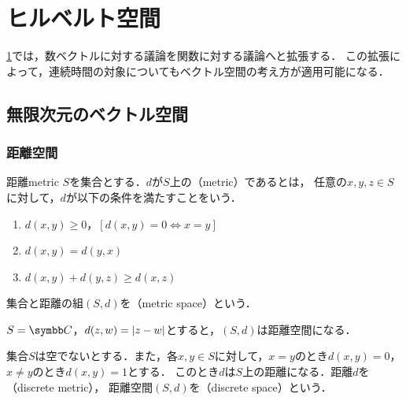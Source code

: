 \documentclass[../../main]{subfiles}
\begin{document}
\chapter{ヒルベルト空間}
\label{chapter:hilbert_space}

\begin{lead}
  \cref{chapter:hilbert_space}では，数ベクトルに対する議論を関数に対する議論へと拡張する．
  この拡張によって，連続時間の対象についてもベクトル空間の考え方が適用可能になる．
\end{lead}

\section{無限次元のベクトル空間}

\subsection{距離空間}

\begin{definition}{距離}{metric}
  \(S\)を集合とする．\(d\)が\(S\)上の（metric）であるとは，
  任意の\(x,y,z\in S\)に対して，\(d\)が以下の条件を満たすことをいう．
  \begin{enumerate}
    \item \(d(x,y)\geq 0\)，\([d(x,y)=0\iff x=y]\)
    \item \(d(x,y)=d(y,x)\)
    \item \(d(x,y)+d(y,z)\geq d(x,z)\)
  \end{enumerate}
\end{definition}

集合と距離の組\((S,d)\)を（metric space）という．

\begin{example}
  \label{example:metric_space}
  \(S=\numset{C}\)，\(d(z,w)=\lvert z-w\rvert\)とすると，\((S,d)\)は距離空間になる．
\end{example}

\begin{example}[離散距離]
  \label{example:discrete_metric}
  集合\(S\)は空でないとする．また，各\(x,y\in S\)に対して，\(x=y\)のとき\(d(x,y)=0\)，\(x\neq y\)のとき\(d(x,y)=1\)とする．
  このとき\(d\)は\(S\)上の距離になる．距離\(d\)を（discrete metric），
  距離空間\((S,d)\)を（discrete space）という．
\end{example}
\end{document}
